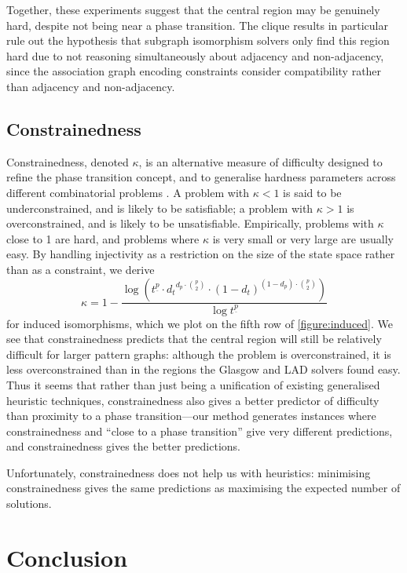 \documentclass[letterpaper]{article}
\newcommand{\citep}[1]{\cite{#1}}
\begin{document}
Together, these experiments suggest that the central region may be genuinely hard, despite not being
near a phase transition. The clique results in particular rule out the hypothesis that subgraph
isomorphism solvers only find this region hard due to not reasoning simultaneously about adjacency
and non-adjacency, since the association graph encoding constraints consider compatibility rather
than adjacency and non-adjacency.

\subsection{Constrainedness}

Constrainedness, denoted $\kappa$, is an alternative measure of difficulty designed to refine the
phase transition concept, and to generalise hardness parameters across different combinatorial
problems \citep{Gent:1996:Kappa}. A problem with $\kappa < 1$ is said to be underconstrained, and is
likely to be satisfiable; a problem with $\kappa > 1$ is overconstrained, and is likely to be
unsatisfiable. Empirically, problems with $\kappa$ close to 1 are hard, and problems where $\kappa$
is very small or very large are usually easy. By handling injectivity as a restriction on the size
of the state space rather than as a constraint, we derive \[ \kappa = 1 - \frac{\log \left(
t^{\underline{p}} \cdot {d_t}^{d_p \cdot \binom{p}{2}} \cdot {(1 - d_{t})}^{(1 - d_{p}) \cdot
\binom{p}{2}} \right)}{\log t^{\underline{p}}}\] for induced isomorphisms, which we plot on the
fifth row of \cref{figure:induced}. We see that constrainedness predicts that the central region
will still be relatively difficult for larger pattern graphs: although the problem is
overconstrained, it is less overconstrained than in the regions the Glasgow and LAD solvers found
easy.  Thus it seems that rather than just being a unification of existing generalised heuristic
techniques, constrainedness also gives a better predictor of difficulty than proximity to a phase
transition---our method generates instances where constrainedness and ``close to a phase
transition'' give very different predictions, and constrainedness gives the better predictions.

Unfortunately, constrainedness does not help us with heuristics: minimising constrainedness gives
the same predictions as maximising the expected number of solutions.

\section{Conclusion}
\end{document}
